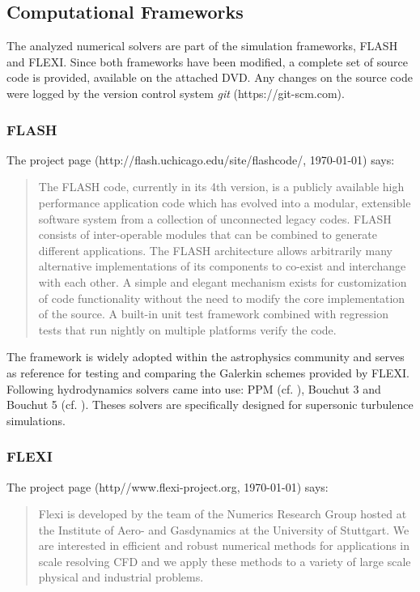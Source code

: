 \subsection{Computational Frameworks}
\label{sec:computational-frameworks}
The analyzed numerical solvers are part of the simulation frameworks, FLASH and
FLEXI. Since both frameworks have been modified, a complete set of source code
is provided, available on the attached DVD. Any changes on the source code were
logged by the version control system \emph{git} (https://git-scm.com).

\subsubsection*{FLASH}
The project page (http://flash.uchicago.edu/site/flashcode/, \today) says:
\begin{quote}
The FLASH code, currently in its 4th version, is a publicly available high
performance application code which has evolved into a modular, extensible
software system from a collection of unconnected legacy codes. FLASH consists
of inter-operable modules that can be combined to generate different
applications. The FLASH architecture allows arbitrarily many alternative
implementations of its components to co-exist and interchange with each other.
A simple and elegant mechanism exists for customization of code functionality
without the need to modify the core implementation of the source. A built-in
unit test framework combined with regression tests that run nightly on multiple
platforms verify the code. 
\end{quote}

The framework is widely adopted within the astrophysics community and serves as
reference for testing and comparing the Galerkin schemes provided by FLEXI.
Following hydrodynamics solvers came into use: PPM (cf.
\cite{colella1984piecewise}), Bouchut 3 and Bouchut 5 (cf.
\cite{bouchut2007multiwave,bouchut2010multiwave}). Theses solvers are 
specifically designed for supersonic turbulence simulations.

\subsubsection*{FLEXI}
The project page (http//www.flexi-project.org, \today) says:
\begin{quote}
Flexi is developed by the team of the Numerics Research Group hosted at the
Institute of Aero- and Gasdynamics at the University of Stuttgart. We are
interested in efficient and robust numerical methods for applications in scale
resolving CFD and we apply these methods to a variety of large scale
physical and industrial problems.
\end{quote}

